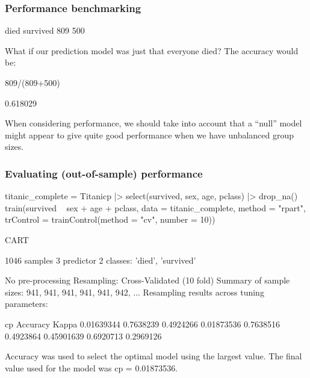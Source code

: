 \documentclass[a4paper]{article}
\begin{document}
\subsubsection{Performance benchmarking}
\begin{Schunk}
\begin{Soutput}

    died survived 
     809      500 
\end{Soutput}
\end{Schunk}
What if our prediction model was just that everyone died? The accuracy would be:
\begin{Schunk}
\begin{Sinput}
809/(809+500)
\end{Sinput}
\begin{Soutput}
[1] 0.618029
\end{Soutput}
\end{Schunk}
When considering performance, we should take into account that a ``null'' model might appear to give quite good performance when we have unbalanced group sizes.
\subsubsection{Evaluating (out-of-sample) performance}
\begin{Schunk}
\begin{Sinput}
titanic_complete = Titanicp |> select(survived, sex, age, pclass) |> drop_na()
train(survived ~ sex + age + pclass, data = titanic_complete,
      method = "rpart", trControl = trainControl(method = "cv", number = 10))
\end{Sinput}
\begin{Soutput}
CART 

1046 samples
   3 predictor
   2 classes: 'died', 'survived' 

No pre-processing
Resampling: Cross-Validated (10 fold) 
Summary of sample sizes: 941, 941, 941, 941, 941, 942, ... 
Resampling results across tuning parameters:

  cp          Accuracy   Kappa    
  0.01639344  0.7638239  0.4924266
  0.01873536  0.7638516  0.4923864
  0.45901639  0.6920713  0.2969126

Accuracy was used to select the optimal model using the largest value.
The final value used for the model was cp = 0.01873536.
\end{Soutput}
\end{Schunk}
\end{document}
